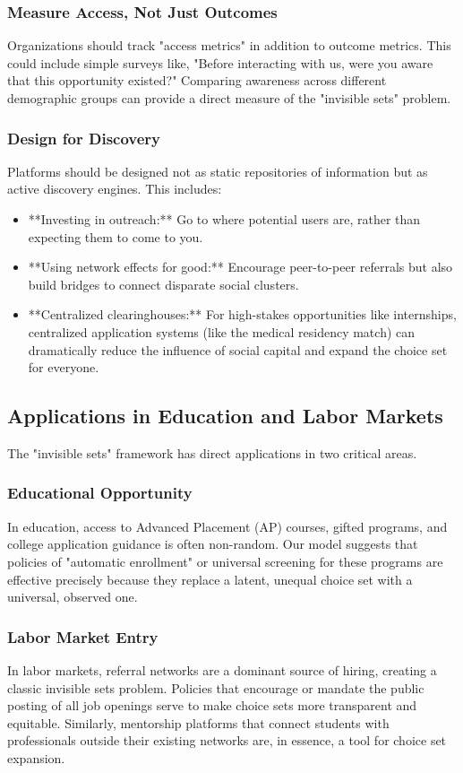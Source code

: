 \subsubsection{Measure Access, Not Just Outcomes}
Organizations should track "access metrics" in addition to outcome metrics. This could include simple surveys like, "Before interacting with us, were you aware that this opportunity existed?" Comparing awareness across different demographic groups can provide a direct measure of the "invisible sets" problem.

\subsubsection{Design for Discovery}
Platforms should be designed not as static repositories of information but as active discovery engines. This includes:
\begin{itemize}
    \item **Investing in outreach:** Go to where potential users are, rather than expecting them to come to you.
    \item **Using network effects for good:** Encourage peer-to-peer referrals but also build bridges to connect disparate social clusters.
    \item **Centralized clearinghouses:** For high-stakes opportunities like internships, centralized application systems (like the medical residency match) can dramatically reduce the influence of social capital and expand the choice set for everyone.
\end{itemize}

\subsection{Applications in Education and Labor Markets}
The "invisible sets" framework has direct applications in two critical areas.

\subsubsection{Educational Opportunity}
In education, access to Advanced Placement (AP) courses, gifted programs, and college application guidance is often non-random. Our model suggests that policies of "automatic enrollment" or universal screening for these programs are effective precisely because they replace a latent, unequal choice set with a universal, observed one.

\subsubsection{Labor Market Entry}
In labor markets, referral networks are a dominant source of hiring, creating a classic invisible sets problem. Policies that encourage or mandate the public posting of all job openings serve to make choice sets more transparent and equitable. Similarly, mentorship platforms that connect students with professionals outside their existing networks are, in essence, a tool for choice set expansion.